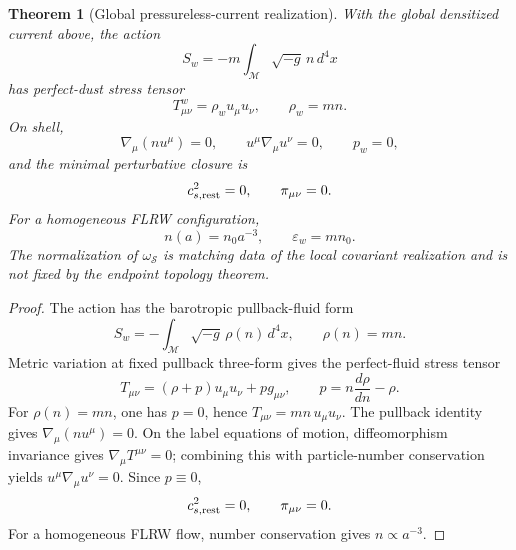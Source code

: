 \documentclass[11pt,a4paper]{article}
\def\dd{d}%
\numberwithin{equation}{section}
\theoremstyle{definition}
\theoremstyle{plain}
\newtheorem{theorem}[criterion]{Theorem}
\theoremstyle{remark}
\newcommand{\M}{\mathcal{M}}
\newcommand{\dd}{\mathrm{d}}
\begin{document}
\begin{theorem}[Global pressureless-current realization]
With the global densitized current above, the action
\begin{equation}
S_w=-m\int_{\M}\sqrt{-g}\,n\,\dd^4x
\end{equation}
has perfect-dust stress tensor
\begin{equation}
T_{\mu\nu}^{w}=\rho_wu_\mu u_\nu,
\qquad
\rho_w=mn.
\end{equation}
On shell,
\begin{equation}
\nabla_\mu(n u^\mu)=0,
\qquad
u^\mu\nabla_\mu u^\nu=0,
\qquad
p_w=0,
\end{equation}
and the minimal perturbative closure is
\begin{equation}
c_{s,\rm rest}^2=0,
\qquad
\pi_{\mu\nu}=0.
\end{equation}
For a homogeneous FLRW configuration,
\begin{equation}
n(a)=n_0a^{-3},
\qquad
\varepsilon_w=mn_0.
\end{equation}
The normalization of \(\omega_{\mathcal S}\) is matching data of the local covariant realization and is not fixed by the endpoint topology theorem.
\end{theorem}
\begin{proof}
The action has the barotropic pullback-fluid form
\begin{equation}
S_w=-\int_{\M}\sqrt{-g}\,\rho(n)\,\dd^4x,
\qquad
\rho(n)=mn.
\end{equation}
Metric variation at fixed pullback three-form gives the perfect-fluid stress tensor
\begin{equation}
T_{\mu\nu}
=(\rho+p)u_\mu u_\nu+pg_{\mu\nu},
\qquad
p=n\frac{\dd\rho}{\dd n}-\rho.
\end{equation}
For \(\rho(n)=mn\), one has \(p=0\), hence
\(T_{\mu\nu}=mn\,u_\mu u_\nu\). The pullback identity gives
\(\nabla_\mu(n u^\mu)=0\). On the label equations of motion,
diffeomorphism invariance gives \(\nabla_\mu T^{\mu\nu}=0\); combining this
with particle-number conservation yields
\(u^\mu\nabla_\mu u^\nu=0\). Since \(p\equiv0\),
\begin{equation}
c_{s,\rm rest}^2=0,
\qquad
\pi_{\mu\nu}=0.
\end{equation}
For a homogeneous FLRW flow, number conservation gives \(n\propto a^{-3}\).
\end{proof}
\end{document}
